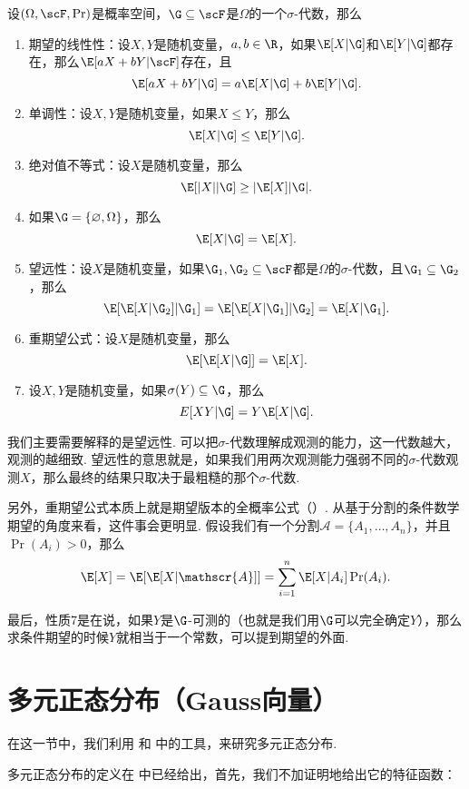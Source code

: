 \begin{proposition}\label{prop:conditional-expectation-basic}
设$(\Omega,\scF,\Pr)$是概率空间，$\G\subseteq\scF$是$\Omega$的一个$\sigma$-代数，那么
\begin{enumerate}
\item 期望的线性性：设$X,Y$是随机变量，$a,b\in\R$，如果$\E[X|\G]$和$\E[Y|\G]$都存在，那么$\E[aX+bY|\scF]$存在，且
\[\E[aX+bY|\G]=a\E[X|\G]+b\E[Y|\G].\]
\item 单调性：设$X,Y$是随机变量，如果$X\leq Y$，那么
\[\E[X|\G]\leq \E[Y|\G].\]
\item 绝对值不等式：设$X$是随机变量，那么
\[\E[|X||\G]\geq |\E[X]|\G|.\]
\item 如果$\G=\{\varnothing,\Omega\}$，那么
\[\E[X|\G]=\E[X].\]
\item 望远性：设$X$是随机变量，如果$\G_1,\G_2\subseteq\scF$都是$\Omega$的$\sigma$-代数，且$\G_1\subseteq\G_2$，那么
\[\E[\E[X|\G_2]|\G_1]=\E[\E[X|\G_1]|\G_2]=\E[X|\G_1].\]
\item 重期望公式：设$X$是随机变量，那么
\[\E[\E[X|\G]]=\E[X].\]
\item 设$X,Y$是随机变量，如果$\sigma(Y)\subseteq\G$，那么
\[E[XY|\G]=Y\E[X|\G].\]
\end{enumerate}
\end{proposition}

我们主要需要解释的是望远性. 可以把$\sigma$-代数理解成观测的能力，这一代数越大，观测的越细致. 望远性的意思就是，如果我们用两次观测能力强弱不同的$\sigma$-代数观测$X$，那么最终的结果只取决于最粗糙的那个$\sigma$-代数. 

另外，重期望公式本质上就是期望版本的全概率公式（）. 从基于分割的条件数学期望的角度来看，这件事会更明显. 假设我们有一个分割$\mathscr{A}=\{A_1,\dots,A_n\}$，并且$\Pr(A_i)>0$，那么
\[\E[X]=\E[\E[X|\mathscr{A}]]=\sum_{i=1}^n \E[X|A_i]\Pr(A_i).\]

最后，性质7是在说，如果$Y$是$\G$-可测的（也就是我们用$\G$可以完全确定$Y$），那么求条件期望的时候$Y$就相当于一个常数，可以提到期望的外面. 

\section{多元正态分布（Gauss向量）}\label{sec:multivariate-normal}

在这一节中，我们利用 和 中的工具，来研究多元正态分布.

多元正态分布的定义在 中已经给出，首先，我们不加证明地给出它的特征函数：

